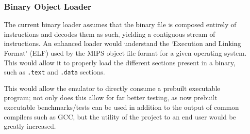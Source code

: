 \subsubsection{Binary Object Loader}

The current binary loader assumes that the binary file is composed entirely of instructions and decodes them as such, yielding a contiguous stream of instructions. An enhanced loader would understand the `Execution and Linking Format' (ELF) \cite{mips-guide} used by the MIPS object file format for a given operating system. This would allow it to properly load the different sections present in a binary, such as \texttt{.text} and \texttt{.data} sections.

This would allow the emulator to directly consume a prebuilt executable program; not only does this allow for far better testing, as now prebuilt executable benchmarks/tests can be used in addition to the output of common compilers such as GCC, but the utility of the project to an end user would be greatly increased.